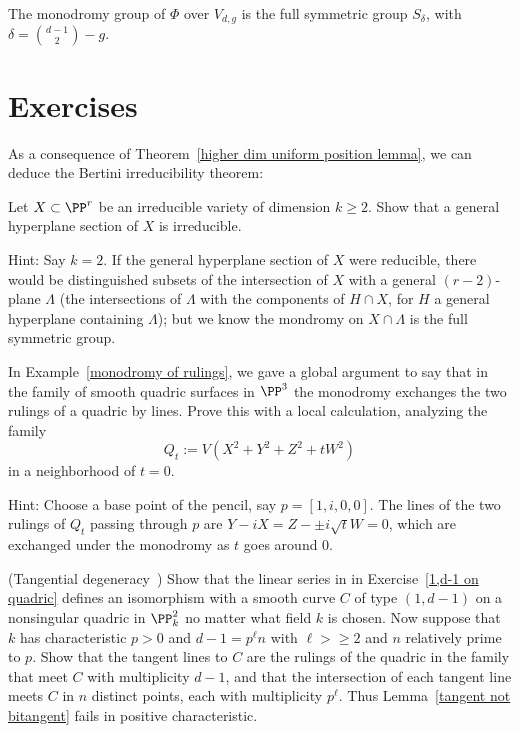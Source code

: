 \begin{proposition}
The monodromy group of $\Phi$ over $V_{d,g}$ is the full symmetric group $S_\delta$, with $\delta = \binom{d-1}{2} - g$.
\end{proposition}



\section{Exercises}

As a consequence of Theorem~\ref{higher dim uniform position lemma}, we can deduce the Bertini irreducibility theorem:

\begin{exercise}
Let $X \subset \PP^r$ be an irreducible variety of dimension $k \geq 2$. Show that a general hyperplane section of $X$ is irreducible.

Hint: Say $k=2$. If the general hyperplane section of $X$ were reducible, there would be distinguished subsets of the intersection of $X$ with a general $(r-2)$-plane $\Lambda$ (the intersections of $\Lambda$ with the components of $H \cap X$, for $H$ a general hyperplane containing $\Lambda$); but we know the mondromy on $X \cap \Lambda$ is the full symmetric group.
\end{exercise}

\begin{exercise}
In Example~\ref{monodromy of rulings}, we gave a global argument to say that in the family of smooth quadric surfaces in $\PP^3$ the monodromy exchanges the two rulings of a quadric by lines. Prove this with a local calculation, analyzing the family
$$
Q_t := V(X^2+Y^2+Z^2 + tW^2)
$$
in a neighborhood of $t=0$.

Hint: Choose a base point of the pencil, say $p = [1, i, 0, 0]$. The lines of the two rulings of $Q_t$ passing through $p$ are
$Y-iX = Z-\pm i\sqrt{t}W = 0$, which are exchanged under the monodromy as $t$ goes around 0.
\end{exercise}

\begin{exercise}(Tangential degeneracy~\cite[Example 4.1]{kaji-tangentialDegeneracy})\label{kaji}
Show that the linear series in in Exercise~\ref{1,d-1 on quadric}
defines an isomorphism with a smooth curve $C$ of type $(1, d-1)$ on a nonsingular quadric in $\PP^2_k$ no matter what field $k$ is chosen. Now suppose that  $k$ has characteristic $p>0$ and $d-1 = p^\ell n$ with $\ell>\geq 2$ and $n$ relatively prime to $p$.
Show that the tangent lines to $C$ are the rulings of the quadric in the family that meet $C$ with multiplicity $d-1$, and that the intersection of each tangent line meets $C$ in $n$ distinct points, each with multiplicity $p^\ell$. Thus Lemma~\ref{tangent not bitangent}
fails in positive characteristic.
\end{exercise}

